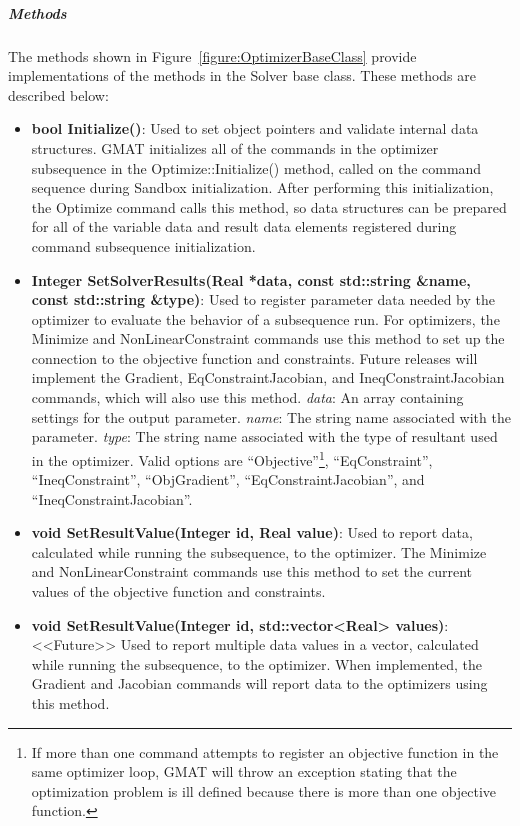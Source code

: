 \subparagraph{\textit{Methods}}  The methods shown in Figure~\ref{figure:OptimizerBaseClass} provide
implementations of the methods in the Solver base class.  These methods are described below:

\begin{itemize}
\item \textbf{bool Initialize()}: Used to set object pointers and validate internal data
structures.  GMAT initializes all of the commands in the optimizer subsequence in the
Optimize::Initialize() method, called on the command sequence during Sandbox initialization. After
performing this initialization, the Optimize command calls this method, so data structures can be
prepared for all of the variable data and result data elements registered during command subsequence
initialization.

\item \textbf{Integer SetSolverResults(Real *data, const std::string \&name, const std::string
\&type)}: Used to register parameter data needed by the optimizer to evaluate the behavior of a
subsequence run.  For optimizers, the Minimize and NonLinearConstraint commands use this method to
set up the connection to the objective function and constraints.  Future releases will implement the
Gradient, EqConstraintJacobian, and IneqConstraintJacobian commands, which will also use this
method.
\subitem \textit{data}: An array containing settings for the output parameter.
\subitem \textit{name}: The string name associated with the parameter.
\subitem \textit{type}: The string name associated with the type of resultant used in the
optimizer. Valid options are ``Objective''\footnote{If more than one command attempts to register an
objective function in the same optimizer loop, GMAT will throw an exception stating that the
optimization problem is ill defined because there is more than one objective function.},
``EqConstraint'', ``IneqConstraint'', ``ObjGradient'', ``EqConstraintJacobian'', and
``IneqConstraintJacobian''.

\item \textbf{void SetResultValue(Integer id, Real value)}:  Used to report data,
calculated while running the subsequence, to the optimizer.  The Minimize and NonLinearConstraint
commands use this method to set the current values of the objective function and constraints.

\item \textbf{void SetResultValue(Integer id, std::vector<Real> values)}:  <<Future>> Used to report
multiple data values in a vector, calculated while running the subsequence, to the optimizer.  When
implemented, the Gradient and Jacobian commands will report data to the optimizers using this
method.
\end{itemize}

